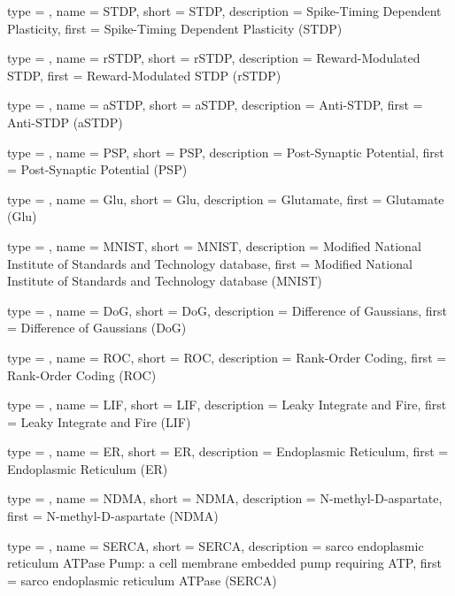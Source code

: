 {
	type        = \acronymtype,
	name        = {STDP},
	short       = {STDP},
	description = {Spike-Timing Dependent Plasticity},
	first       = {Spike-Timing Dependent Plasticity (STDP)}
}

{
	type        = \acronymtype,
	name        = {rSTDP},
	short       = {rSTDP},
	description = {Reward-Modulated STDP},
	first       = {Reward-Modulated STDP (rSTDP)}
}

{
	type        = \acronymtype,
	name        = {aSTDP},
	short       = {aSTDP},
	description = {Anti-STDP},
	first       = {Anti-STDP (aSTDP)}
}

{
	type        = \acronymtype,
	name        = {PSP},
	short       = {PSP},
	description = {Post-Synaptic Potential},
	first       = {Post-Synaptic Potential (PSP)}
}

{
	type        = \acronymtype,
	name        = {Glu},
	short       = {Glu},
	description = {Glutamate},
	first       = {Glutamate (Glu)}
}

{
	type        = \acronymtype,
	name        = {MNIST},
	short       = {MNIST},
	description = {Modified National Institute of Standards and Technology database},
	first       = {Modified National Institute of Standards and Technology database (MNIST)}
}

{
	type        = \acronymtype,
	name        = {DoG},
	short       = {DoG},
	description = {Difference of Gaussians},
	first       = {Difference of Gaussians (DoG)}
}

{
	type        = \acronymtype,
	name        = {ROC},
	short       = {ROC},
	description = {Rank-Order Coding},
	first       = {Rank-Order Coding (ROC)}
}

{
	type        = \acronymtype,
	name        = {LIF},
	short       = {LIF},
	description = {Leaky Integrate and Fire},
	first       = {Leaky Integrate and Fire (LIF)}
}

{
	type        = \acronymtype,
	name        = {ER},
	short       = {ER},
	description = {Endoplasmic Reticulum},
	first       = {Endoplasmic Reticulum (ER)}
}

{
	type        = \acronymtype,
	name        = {NDMA},
	short       = {NDMA},
	description = {N-methyl-D-aspartate},
	first       = {N-methyl-D-aspartate (NDMA)}
}

{
	type        = \acronymtype,
	name        = {SERCA},
	short       = {SERCA},
	description = {sarco endoplasmic reticulum ATPase Pump: a cell membrane embedded pump requiring ATP},
	first       = {sarco endoplasmic reticulum ATPase (SERCA)}
}

